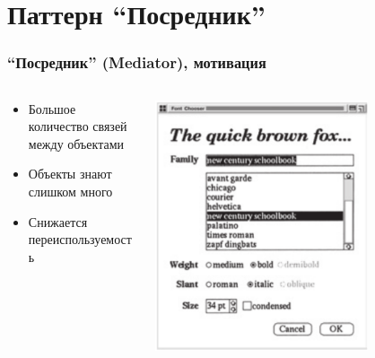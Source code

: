 \documentclass[xetex,mathserif,serif]{beamer}
\begin{document}
    \section{Паттерн ``Посредник''}

    \begin{frame}
        \frametitle{``Посредник'' (Mediator), мотивация}
        \begin{columns}
            \begin{column}{0.6\textwidth}
                \begin{itemize}
                    \item Большое количество связей между объектами
                    \item Объекты знают слишком много
                    \item Снижается переиспользуемость
                \end{itemize}
            \end{column}
            \begin{column}{0.4\textwidth}
                \begin{center}
                    \includegraphics[width=0.7\textwidth]{mediatorMotivation.png}
                \end{center}
            \end{column}
        \end{columns}
    \end{frame}
\end{document}
